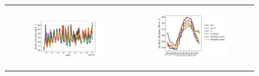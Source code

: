 \begin{figure}[hbtp]
\begin{tabular}{cc}
        \begin{subfigure}[t]{0.5\textwidth}
            \caption{}
            \includegraphics[width=\textwidth]{images/chap6/SOP_TS_DC/time_series_cendrosa_LWdnSFC.png}
        \end{subfigure} &
        \begin{subfigure}[t]{0.5\textwidth}
            \caption{}
            \includegraphics[width=\textwidth]{images/chap6/SOP_TS_DC/diurnal_cycle_cendrosa_LWdnSFC.png}
        \end{subfigure} \\


\end{tabular}
\end{figure}
